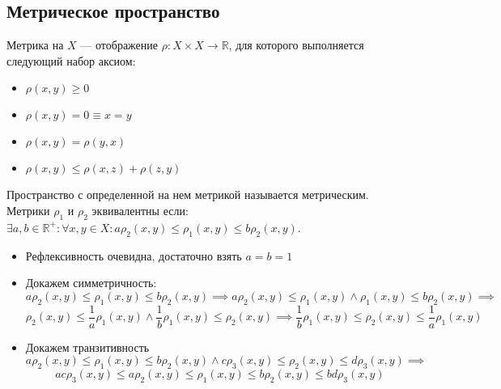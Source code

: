 \subsection{Метрическое пространство}
Метрика на $X$ --- отображение $\rho : X \times X \to \mathbb{R}$, для которого выполняется следующий набор аксиом: 
\begin{itemize}
    \item $\rho(x, y) \geq 0$
    \item $\rho(x, y) = 0 \equiv x = y$
    \item $\rho(x, y) = \rho(y, x)$
    \item $\rho(x, y) \leq \rho(x, z) + \rho(z, y)$
\end{itemize}
Пространство с определенной на нем метрикой называется метрическим. \\
Метрики $\rho_1$ и $\rho_2$ эквивалентны если: 
$\exists a, b \in \mathbb{R}^+ : \forall x, y \in X : a\rho_2(x, y) \leq \rho_1(x, y) \leq b\rho_2(x, y)$.
\begin{itemize}
    \item Рефлексивность очевидна, достаточно взять $a = b = 1$
    \item Докажем симметричность:
    $$
    a\rho_2(x, y) \leq \rho_1(x, y) \leq b\rho_2(x, y) \implies
    a\rho_2(x, y) \leq \rho_1(x, y) \land \rho_1(x, y) \leq b\rho_2(x, y) \implies
    $$
    $$
    \rho_2(x, y) \leq \frac{1}{a}\rho_1(x, y) \land \frac{1}{b}\rho_1(x, y) \leq \rho_2(x, y) \implies \frac{1}{b}\rho_1(x, y) \leq \rho_2(x, y) \leq \frac{1}{a}\rho_1(x, y)
    $$
    \item Докажем транзитивность
    $$
    a\rho_2(x, y) \leq \rho_1(x, y) \leq b\rho_2(x, y) \land c\rho_3(x, y) \leq \rho_2(x, y) \leq d\rho_3(x, y) \implies
    $$
    $$
    ac\rho_3(x,y) \leq a\rho_2(x,y) \leq \rho_1(x,y) \leq b\rho_2(x,y) \leq bd\rho_3(x, y)
    $$
\end{itemize}
